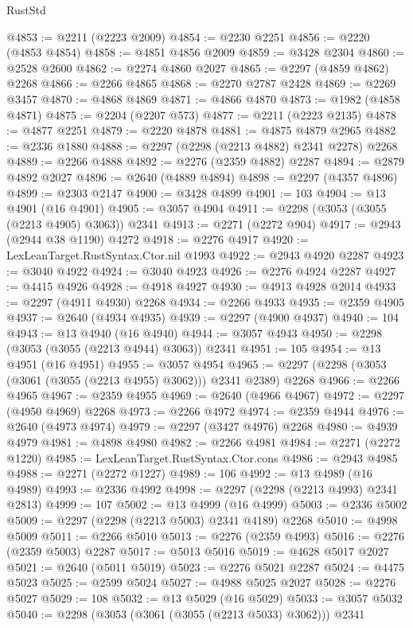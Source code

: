 \begin{lexlean}{RustStd}
\begin{coremodule}
@4853 := @2211 (@2223 @2009)
@4854 := @2230 @2251
@4856 := @2220 (@4853 @4854)
@4858 := @4851 @4856 @2009
@4859 := @3428 @2304
@4860 := @2528 @2600
@4862 := @2274 @4860 @2027
@4865 := @2297 (@4859 @4862) @2268
@4866 := @2266 @4865
@4868 := @2270 @2787 @2428
@4869 := @2269 @3457
@4870 := @4868 @4869
@4871 := @4866 @4870
@4873 := @1982 (@4858 @4871)
@4875 := @2204 (@2207 @573)
@4877 := @2211 (@2223 @2135)
@4878 := @4877 @2251
@4879 := @2220 @4878
@4881 := @4875 @4879 @2965
@4882 := @2336 @1880
@4888 := @2297 (@2298 (@2213 @4882) @2341 @2278) @2268
@4889 := @2266 @4888
@4892 := @2276 (@2359 @4882) @2287
@4894 := @2879 @4892 @2027
@4896 := @2640 (@4889 @4894)
@4898 := @2297 (@4357 @4896)
@4899 := @2303 @2147
@4900 := @3428 @4899
@4901 := 103
@4904 := @13 @4901 (@16 @4901)
@4905 := @3057 @4904
@4911 := @2298 (@3053 (@3055 (@2213 @4905) @3063)) @2341
@4913 := @2271 (@2272 @904)
@4917 := @2943 (@2944 @38 @1190) @4272
@4918 := @2276 @4917
@4920 := LexLeanTarget.RustSyntax.Ctor.nil @1993
@4922 := @2943 @4920 @2287
@4923 := @3040 @4922
@4924 := @3040 @4923
@4926 := @2276 @4924 @2287
@4927 := @4415 @4926
@4928 := @4918 @4927
@4930 := @4913 @4928 @2014
@4933 := @2297 (@4911 @4930) @2268
@4934 := @2266 @4933
@4935 := @2359 @4905
@4937 := @2640 (@4934 @4935)
@4939 := @2297 (@4900 @4937)
@4940 := 104
@4943 := @13 @4940 (@16 @4940)
@4944 := @3057 @4943
@4950 := @2298 (@3053 (@3055 (@2213 @4944) @3063)) @2341
@4951 := 105
@4954 := @13 @4951 (@16 @4951)
@4955 := @3057 @4954
@4965 := @2297 (@2298 (@3053 (@3061 (@3055 (@2213 @4955) @3062))) @2341 @2389) @2268
@4966 := @2266 @4965
@4967 := @2359 @4955
@4969 := @2640 (@4966 @4967)
@4972 := @2297 (@4950 @4969) @2268
@4973 := @2266 @4972
@4974 := @2359 @4944
@4976 := @2640 (@4973 @4974)
@4979 := @2297 (@3427 @4976) @2268
@4980 := @4939 @4979
@4981 := @4898 @4980
@4982 := @2266 @4981
@4984 := @2271 (@2272 @1220)
@4985 := LexLeanTarget.RustSyntax.Ctor.cons
@4986 := @2943 @4985
@4988 := @2271 (@2272 @1227)
@4989 := 106
@4992 := @13 @4989 (@16 @4989)
@4993 := @2336 @4992
@4998 := @2297 (@2298 (@2213 @4993) @2341 @2813)
@4999 := 107
@5002 := @13 @4999 (@16 @4999)
@5003 := @2336 @5002
@5009 := @2297 (@2298 (@2213 @5003) @2341 @4189) @2268
@5010 := @4998 @5009
@5011 := @2266 @5010
@5013 := @2276 (@2359 @4993)
@5016 := @2276 (@2359 @5003) @2287
@5017 := @5013 @5016
@5019 := @4628 @5017 @2027
@5021 := @2640 (@5011 @5019)
@5023 := @2276 @5021 @2287
@5024 := @4475 @5023
@5025 := @2599 @5024
@5027 := @4988 @5025 @2027
@5028 := @2276 @5027
@5029 := 108
@5032 := @13 @5029 (@16 @5029)
@5033 := @3057 @5032
@5040 := @2298 (@3053 (@3061 (@3055 (@2213 @5033) @3062))) @2341

\end{coremodule}
\end{lexlean}
